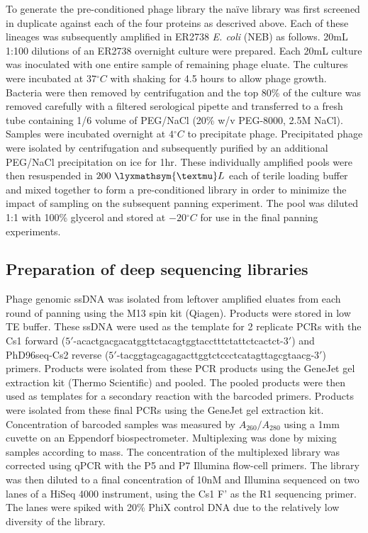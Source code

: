 To generate the pre-conditioned phage library the naïve library was
first screened in duplicate against each of the four proteins as descrived
above. Each of these lineages was subsequently amplified in ER2738
\textit{E. coli} (NEB) as follows. 20mL 1:100 dilutions of an ER2738
overnight culture were prepared. Each 20mL culture was inoculated
with one entire sample of remaining phage eluate. The cultures were
incubated at $37{^\circ}C$ with shaking for 4.5 hours to allow phage
growth. Bacteria were then removed by centrifugation and the top 80\%
of the culture was removed carefully with a filtered serological pipette
and transferred to a fresh tube containing 1/6 volume of PEG/NaCl
(20\% w/v PEG-8000, 2.5M NaCl). Samples were incubated overnight at
$4{^\circ}C$ to precipitate phage. Precipitated phage were isolated
by centrifugation and subsequently purified by an additional PEG/NaCl
precipitation on ice for 1hr. These individually amplified pools were
then resuspended in $200\ \lyxmathsym{\textmu}L$ each of terile loading
buffer and mixed together to form a pre-conditioned library in order
to minimize the impact of sampling on the subsequent panning experiment.
The pool was diluted 1:1 with 100\% glycerol and stored at $-20{^\circ}C$
for use in the final panning experiments. 

\subsection{Preparation of deep sequencing libraries}

Phage genomic ssDNA was isolated from leftover amplified eluates from
each round of panning using the M13 spin kit (Qiagen). Products were
stored in low TE buffer. These ssDNA were used as the template for
2 replicate PCRs with the Cs1 forward ($5'$-acactgacgacatggttctacagtggtacctttctattctcactct-$3'$)
and PhD96seq-Cs2 reverse ($5'$-tacggtagcagagacttggtctccctcatagttagcgtaacg-$3'$)
primers. Products were isolated from these PCR products using the
GeneJet gel extraction kit (Thermo Scientific) and pooled. The pooled
products were then used as templates for a secondary reaction with
the barcoded primers. Products were isolated from these final PCRs
using the GeneJet gel extraction kit. Concentration of barcoded samples
was measured by $A_{260}/A_{280}$ using a 1mm cuvette on an Eppendorf
biospectrometer. Multiplexing was done by mixing samples according
to mass. The concentration of the multiplexed library was corrected
using qPCR with the P5 and P7 Illumina flow-cell primers. The library
was then diluted to a final concentration of 10nM and Illumina sequenced
on two lanes of a HiSeq 4000 instrument, using the Cs1 F' as the R1
sequencing primer. The lanes were spiked with 20\% PhiX control DNA
due to the relatively low diversity of the library. 

